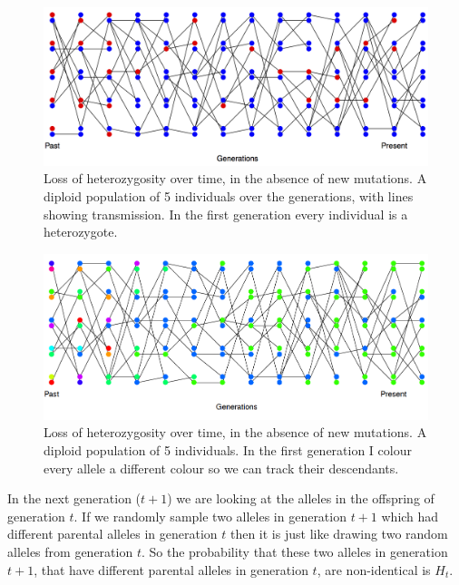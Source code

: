 \begin{figure}
\begin{center}
\includegraphics[width= \textwidth]{figures/Loss_of_he_col_two_alleles.png}
\end{center}
\caption{Loss of heterozygosity over time, in the absence of new
  mutations. A diploid population of 5 individuals over the
  generations, with lines showing transmission. In the first
  generation every individual is a heterozygote.} \label{fig:LossHet_two_alleles}
\end{figure} 

\begin{figure}
\begin{center}
\includegraphics[width= \textwidth]{figures/Loss_of_het_2_many_alleles.png}
\end{center}
\caption{Loss of heterozygosity over time, in the absence of new
  mutations. A diploid population of 5 individuals. In the first generation I colour every allele a different
colour so we can track their descendants.} \label{fig:LossHet_many_alleles}
\end{figure} 

In the next generation ($t+1$) we are looking at the alleles in the
offspring of generation $t$. If we randomly sample two alleles in generation
$t+1$ which had different parental alleles in generation $t$ then it
is just like drawing two random alleles from generation $t$. So the
probability that these two alleles in generation $t+1$, that have
different parental alleles in generation $t$, are non-identical is
$H_t$. \\


